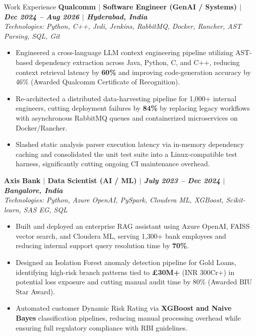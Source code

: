 \documentclass[11pt]{resume}
\begin{document}
\begin{rSection}{Work Experience}
{\bf Qualcomm $|$ \textnormal{Software Engineer (GenAI / Systems)} $|$ \em Dec 2024 -- Aug 2026 $|$ Hyderabad, India} \\
{\em Technologies: Python, C++, Jedi, Jenkins, RabbitMQ, Docker, Rancher, AST Parsing, SQL, Git}
\vspace{-0.6em}
\begin{itemize}
    \setlength{\itemsep}{-0.35em}
    \setlength{\parsep}{0em}
    \item Engineered a cross-language LLM context engineering pipeline utilizing AST-based dependency extraction across Java, Python, C, and C++, reducing context retrieval latency by \textbf{60\%} and improving code-generation accuracy by 46\% (Awarded Qualcomm Certificate of Recognition).
    \item Re-architected a distributed data-harvesting pipeline for 1,000+ internal engineers, cutting deployment failures by \textbf{84\%} by replacing legacy workflows with asynchronous RabbitMQ queues and containerized microservices on Docker/Rancher.
    \item Slashed static analysis parser execution latency via in-memory dependency caching and consolidated the unit test suite into a Linux-compatible test harness, significantly cutting ongoing CI maintenance overhead.
\end{itemize}

{\bf Axis Bank $|$ \textnormal{Data Scientist (AI / ML)} $|$ \em July 2023 -- Dec 2024 $|$ Bangalore, India} \\
{\em Technologies: Python, Azure OpenAI, PySpark, Cloudera ML, XGBoost, Scikit-learn, SAS EG, SQL}
\vspace{-0.6em}
\begin{itemize}
    \setlength{\itemsep}{-0.35em}
    \setlength{\parsep}{0em}
    \item Built and deployed an enterprise RAG assistant using Azure OpenAI, FAISS vector search, and Cloudera ML, serving 1,300+ bank employees and reducing internal support query resolution time by \textbf{70\%}.
    \item Designed an Isolation Forest anomaly detection pipeline for Gold Loans, identifying high-risk branch patterns tied to \textbf{\pounds 30M+} (INR 300Cr+) in potential loss exposure and cutting manual audit time by 80\% (Awarded BIU Star Award).
    \item Automated customer Dynamic Risk Rating via \textbf{XGBoost and Naive Bayes} classification pipelines, reducing manual processing overhead while ensuring full regulatory compliance with RBI guidelines.
\end{itemize}
\end{rSection}
\end{document}
